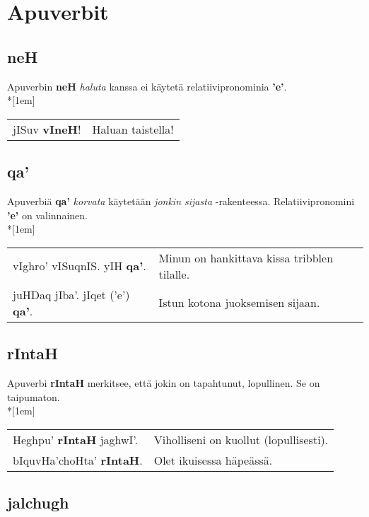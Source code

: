 \documentclass{book}
\begin{document}
\section{Apuverbit}

\subsection{neH}

Apuverbin \textbf{neH} \textit{haluta} kanssa ei käytetä relatiivipronominia \textbf{'e'}. \\*[1em]
\begin{tabular}{l l}
    jISuv \textbf{vIneH}! & Haluan taistella! \\
\end{tabular}

\subsection{qa'}

Apuverbiä \textbf{qa'} \textit{korvata} käytetään \textit{jonkin sijasta} -rakenteessa. Relatiivipronomini \textbf{'e'} on valinnainen.\\*[1em]
\begin{tabular}{l l}
    vIghro' vISuqnIS. yIH \textbf{qa'}. & Minun on hankittava kissa tribblen tilalle. \\
    juHDaq jIba'. jIqet ('e') \textbf{qa'}. & Istun kotona juoksemisen sijaan. \\
\end{tabular}

\subsection{rIntaH}
\label{subsec:rintah}

Apuverbi \textbf{rIntaH} merkitsee, että jokin on tapahtunut, lopullinen. Se on taipumaton.\\*[1em]
\begin{tabular}{l l}
    Heghpu' \textbf{rIntaH} jaghwI'. & Viholliseni on kuollut (lopullisesti). \\
    bIquvHa'choHta' \textbf{rIntaH}. & Olet ikuisessa häpeässä. \\
\end{tabular}

\subsection{jalchugh}
\end{document}
